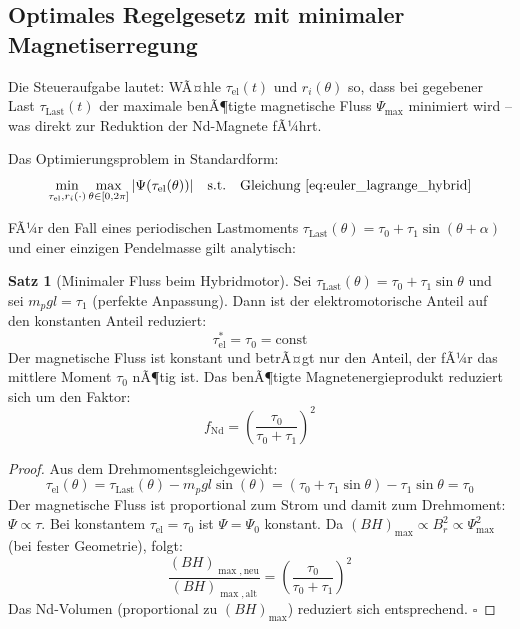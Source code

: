 ﻿\documentclass[12pt, a4paper]{report}
\theoremstyle{definition}
\newtheorem{theorem}{Satz}[section]
\theoremstyle{remark}
\begin{document}
\subsection{Optimales Regelgesetz mit minimaler Magnetiserregung}

Die Steueraufgabe lautet: WÃ¤hle $\tau_{\text{el}}(t)$ und $r_i(\theta)$ so, dass
bei gegebener Last $\tau_{\text{Last}}(t)$ der maximale benÃ¶tigte magnetische Fluss
$\Psi_{\max}$ minimiert wird -- was direkt zur Reduktion der Nd-Magnete fÃ¼hrt.

Das Optimierungsproblem in Standardform:
\begin{equation}
  \min_{\tau_{\text{el}}, r_i(\cdot)}
    \max_{\theta \in [0, 2\pi]} |\Psi(\tau_{\text{el}}(\theta))|
  \quad\text{s.t.}\quad \text{Gleichung~\eqref{eq:euler_lagrange_hybrid}}
  \label{eq:optproblem}
\end{equation}

FÃ¼r den Fall eines periodischen Lastmoments $\tau_{\text{Last}}(\theta) =
\tau_0 + \tau_1\sin(\theta + \alpha)$ und einer einzigen Pendelmasse gilt analytisch:

\begin{theorem}[Minimaler Fluss beim Hybridmotor]
  \label{thm:hybridmotor}
  Sei $\tau_{\text{Last}}(\theta) = \tau_0 + \tau_1\sin\theta$ und sei
  $m_p g l = \tau_1$ (perfekte Anpassung). Dann ist der elektromotorische
  Anteil auf den konstanten Anteil reduziert:
  \begin{equation}
    \tau_{\text{el}}^* = \tau_0 = \text{const}
    \label{eq:tau_el_opt}
  \end{equation}
  Der magnetische Fluss ist konstant und betrÃ¤gt nur den Anteil, der fÃ¼r
  das mittlere Moment $\tau_0$ nÃ¶tig ist. Das benÃ¶tigte Magnetenergieprodukt
  reduziert sich um den Faktor:
  \begin{equation}
    f_{\text{Nd}} = \left(\frac{\tau_0}{\tau_0 + \tau_1}\right)^2
    \label{eq:f_nd}
  \end{equation}
\end{theorem}

\begin{proof}
  Aus dem Drehmomentsgleichgewicht:
  \begin{equation}
    \tau_{\text{el}}(\theta) = \tau_{\text{Last}}(\theta) - m_p g l \sin(\theta)
    = (\tau_0 + \tau_1\sin\theta) - \tau_1\sin\theta = \tau_0
  \end{equation}
  Der magnetische Fluss ist proportional zum Strom und damit zum Drehmoment:
  $\Psi \propto \tau$. Bei konstantem $\tau_{\text{el}} = \tau_0$ ist
  $\Psi = \Psi_0$ konstant. Da $(BH)_{\max} \propto B_r^2 \propto \Psi_{\max}^2$
  (bei fester Geometrie), folgt:
  \begin{equation}
    \frac{(BH)_{\max,\text{neu}}}{(BH)_{\max,\text{alt}}} = \left(\frac{\tau_0}{\tau_0+\tau_1}\right)^2
  \end{equation}
  Das Nd-Volumen (proportional zu $(BH)_{\max}$) reduziert sich entsprechend. $\square$
\end{proof}
\end{document}
